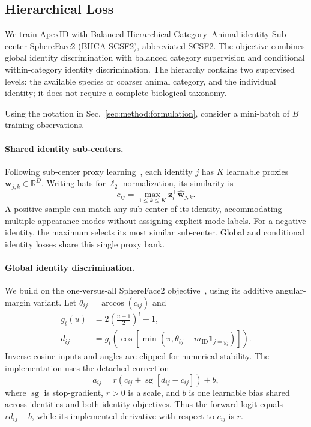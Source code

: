\subsection{Hierarchical Loss}
\label{sec:method:loss}

We train ApexID with Balanced Hierarchical Category--Animal identity
Sub-center SphereFace2 (BHCA-SCSF2), abbreviated SCSF2.
The objective combines global identity discrimination with balanced category
supervision and conditional within-category identity discrimination.
The hierarchy contains two supervised levels: the available species or
coarser animal category, and the individual identity; it does not require a
complete biological taxonomy.

Using the notation in Sec.~\ref{sec:method:formulation},
consider a mini-batch of $B$ training observations.

\paragraph{Shared identity sub-centers.}
Following sub-center proxy learning~\cite{deng2020subcenter}, each identity
$j$ has $K$ learnable proxies $\mathbf{w}_{j,k}\in\mathbb{R}^{D}$.
Writing hats for $\ell_2$ normalization, its similarity is
\begin{equation}
c_{ij}=\max_{1\leq k\leq K}\mathbf{z}_i^\top\widehat{\mathbf{w}}_{j,k}.
\label{eq:scsf2:subcenter}
\end{equation}
A positive sample can match any sub-center of its identity, accommodating
multiple appearance modes without assigning explicit mode labels.
For a negative identity, the maximum selects its most similar sub-center.
Global and conditional identity losses share this single proxy bank.

\paragraph{Global identity discrimination.}
We build on the one-versus-all SphereFace2
objective~\cite{wen2022sphereface2}, using its additive angular-margin
variant. Let $\theta_{ij}=\arccos(c_{ij})$ and
\begin{align}
g_t(u)&=2\left(\frac{u+1}{2}\right)^t-1,\\
d_{ij}&=g_t\!\left(\cos\!\left[
\min\!\left(\pi,\theta_{ij}
+m_{\mathrm{ID}}\mathbf{1}_{j=y_i}\right)\right]\right).
\label{eq:scsf2:transform}
\end{align}
Inverse-cosine inputs and angles are clipped for numerical stability.
The implementation uses the detached correction
\begin{equation}
a_{ij}=r\left(c_{ij}+
\operatorname{sg}[d_{ij}-c_{ij}]\right)+b,
\label{eq:scsf2:logits}
\end{equation}
where $\operatorname{sg}$ is stop-gradient, $r>0$ is a scale, and $b$ is
one learnable bias shared across identities and both identity objectives.
Thus the forward logit equals $r d_{ij}+b$, while its implemented
derivative with respect to $c_{ij}$ is $r$.

